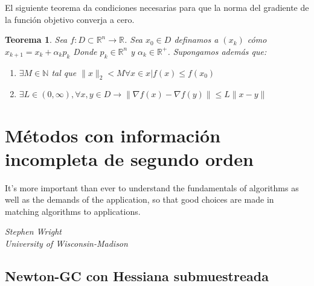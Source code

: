 \documentclass{book}
\theoremstyle{plain}
\newtheorem{thm}{Teorema}[section]
\theoremstyle{definition}
\theoremstyle{remark}
\begin{document}
\begin{subappendices}
El siguiente teorema da condiciones necesarias para que la norma del gradiente de la función objetivo converja a cero. 

\begin{thm}
Sea $f:D\subset\mathbb{R}^n\rightarrow\mathbb{R}$. Sea $x_0\in D$ definamos a $(x_k)$ cómo $x_{k+1} = x_k + \alpha_kp_k$ Donde $p_k\in\mathbb{R}^n$ y $\alpha_k\in\mathbb{R}^+$. Supongamos además que:
\begin{enumerate}
\item $\exists M\in\mathbb{N}$ tal que $\|x\|_2<M\forall x\in{x|f(x)\leq f(x_0)}$
\item $\exists L\in (0,\infty),\forall x,y\in D\rightarrow \|\nabla f(x)- \nabla f(y)\|\leq L\|x-y\|$
\end{enumerate}
\end{thm}


\end{subappendices}

\chapter{Métodos con información \\ incompleta de segundo orden}
\epigraph{It’s more important than ever to understand the fundamentals of
algorithms as well as the demands of the application, so that good
choices are made in matching algorithms to applications.}{\textit{Stephen Wright \\ University of Wisconsin-Madison}}
\newpage

\section{Newton-GC con Hessiana submuestreada}
\end{document}
